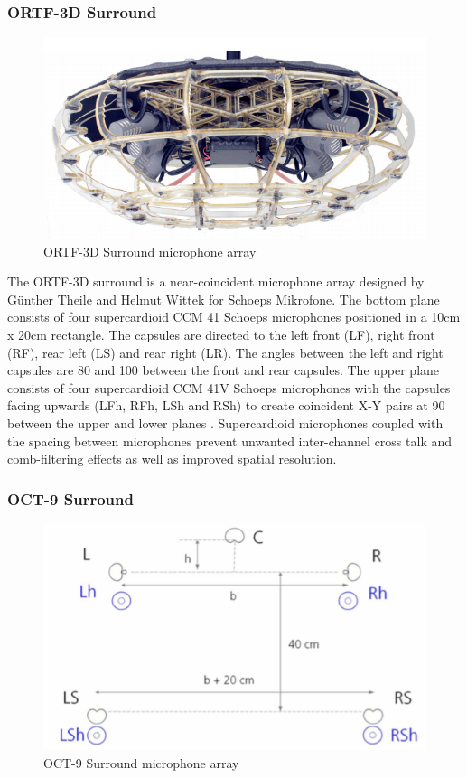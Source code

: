 		\subsubsection{ORTF-3D Surround}

			\begin{figure}[h!]
			\begin{center}
				\includegraphics[width = 0.45\linewidth]{images/mic/ortf3D.PNG}
				\caption{ORTF-3D Surround microphone array \cite{ORTF3D2}}
				\label{ORTF3D}
			\end{center}
			\end{figure}

			The ORTF-3D surround is a near-coincident microphone array designed by G\"{u}nther Theile and Helmut Wittek for Schoeps Mikrofone. The bottom plane consists of four supercardioid CCM 41 Schoeps microphones positioned in a 10cm x 20cm rectangle. The capsules are directed to the left front (LF), right front (RF), rear left (LS) and rear right (LR). The angles between the left and right capsules are 80\textdegree{} and 100\textdegree{} between the front and rear capsules. The upper plane consists of four supercardioid CCM 41V Schoeps microphones with the capsules facing upwards (LFh, RFh, LSh and RSh) to create coincident X-Y pairs at 90\textdegree{} between the upper and lower planes \cite{ORTF3D2}. Supercardioid microphones coupled with the spacing between microphones prevent unwanted inter-channel cross talk and comb-filtering effects as well as improved spatial resolution.

		\subsubsection{OCT-9 Surround}
			\label{sec:OCT9}	

			\begin{figure}[h!]
			\begin{center}
				\includegraphics[width = 0.6\linewidth]{images/mic/OCT.png}
				\caption{OCT-9 Surround microphone array \cite{TheileWittek}}
				\label{oct}
			\end{center}
			\end{figure}

